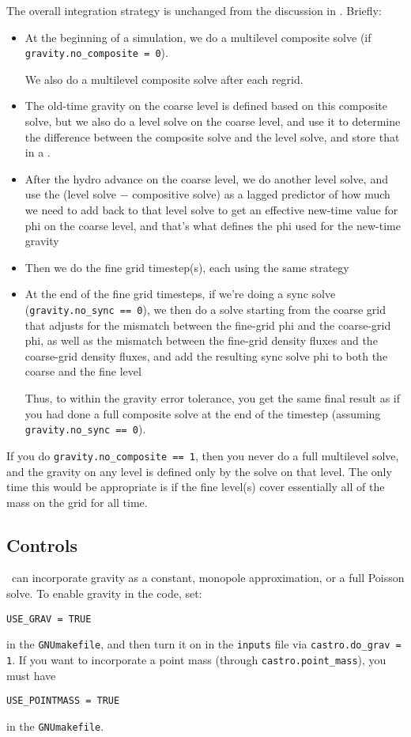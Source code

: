 The overall integration strategy is unchanged from the discussion in
\cite{castro_I}.  Briefly:
\begin{itemize}
\item At the beginning of a simulation, we do a multilevel composite
  solve (if {\tt gravity.no\_composite = 0}).  

  We also do a multilevel composite solve after each regrid.

\item The old-time gravity on the coarse level is defined based on
  this composite solve, but we also do a level solve on the coarse
  level, and use it to determine the difference between the composite
  solve and the level solve, and store that in a \multifab.

\item After the hydro advance on the coarse level, we do another level
  solve, and use the (level solve $-$ compositive solve) as a lagged
  predictor of how much we need to add back to that level solve to get
  an effective new-time value for phi on the coarse level, and that's
  what defines the phi used for the new-time gravity

\item Then we do the fine grid timestep(s), each using the same
  strategy

\item At the end of the fine grid timesteps, if we're doing a sync
  solve ({\tt gravity.no\_sync == 0}), we then do a solve starting from
  the coarse grid that adjusts for the mismatch between the fine-grid
  phi and the coarse-grid phi, as well as the mismatch between the
  fine-grid density fluxes and the coarse-grid density fluxes, and add
  the resulting sync solve phi to both the coarse and the fine level

  Thus, to within the gravity error tolerance, you get the same final
  result as if you had done a full composite solve at the end of the
  timestep (assuming {\tt gravity.no\_sync == 0}).
\end{itemize}

If you do {\tt gravity.no\_composite == 1}, then you never do a full
multilevel solve, and the gravity on any level is defined only by the
solve on that level.  The only time this would be appropriate is if
the fine level(s) cover essentially all of the mass on the grid for
all time.




\subsection{Controls}
\castro\ can incorporate gravity as a constant, monopole approximation,
or a full Poisson solve.  To enable gravity in the code, set:
\begin{verbatim}
USE_GRAV = TRUE
\end{verbatim}
in the {\tt GNUmakefile}, and then turn it on in the {\tt inputs} file
via {\tt castro.do\_grav = 1}.  If you want to incorporate a point mass
(through {\tt castro.point\_mass}), you must have
\begin{verbatim}
USE_POINTMASS = TRUE
\end{verbatim}
in the {\tt GNUmakefile}.

